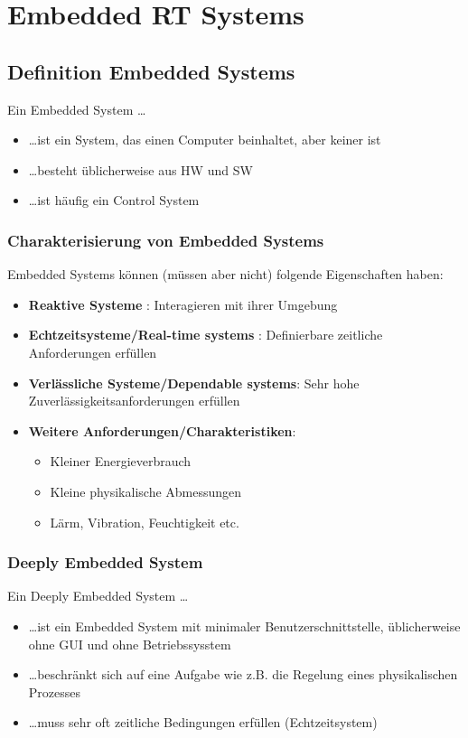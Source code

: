 \section{Embedded RT Systems}
\subsection{Definition Embedded Systems}
Ein Embedded System \ldots
\begin{itemize}
  \item \ldots ist ein System, das einen Computer beinhaltet, aber keiner ist
  \item \ldots besteht üblicherweise aus HW und SW
  \item \ldots ist häufig ein Control System
\end{itemize}
\subsubsection{Charakterisierung von Embedded Systems}
Embedded Systems können (müssen aber nicht) folgende Eigenschaften haben:
\begin{itemize}
  \item \textbf{Reaktive Systeme} : Interagieren mit ihrer Umgebung
  \item \textbf{Echtzeitsysteme/Real-time systems} : Definierbare zeitliche
        Anforderungen erfüllen
  \item \textbf{Verlässliche Systeme/Dependable systems}: Sehr hohe
        Zuverlässigkeitsanforderungen erfüllen
  \item \textbf{Weitere Anforderungen/Charakteristiken}:
        \begin{itemize}
          \item Kleiner Energieverbrauch
          \item Kleine physikalische Abmessungen
          \item Lärm, Vibration, Feuchtigkeit etc.
        \end{itemize}
\end{itemize}

\subsubsection{Deeply Embedded System}
Ein Deeply Embedded System \ldots
\begin{itemize}
  \item \ldots ist ein Embedded System mit minimaler Benutzerschnittstelle, üblicherweise ohne GUI und ohne Betriebssysstem
  \item \ldots beschränkt sich auf eine Aufgabe wie z.B. die Regelung eines physikalischen Prozesses
  \item \ldots muss sehr oft zeitliche Bedingungen erfüllen (Echtzeitsystem)
\end{itemize}

